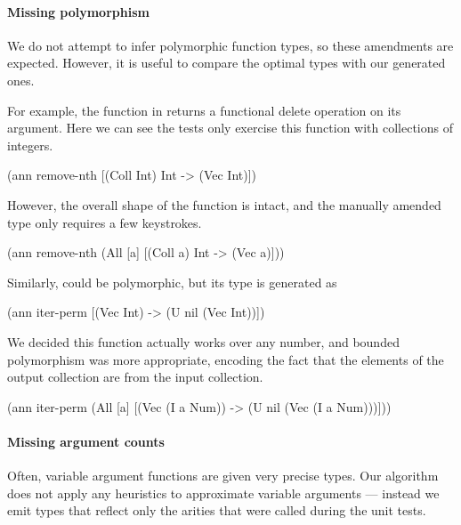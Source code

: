 \paragraph{Missing polymorphism}

We do not attempt to infer polymorphic function types, 
so these amendments are expected. However, it is useful
to compare the optimal types with our generated ones.

For example, the  function in 
returns a functional delete operation on its argument.
Here we can see the tests only exercise this function with
collections of integers.

\begin{cljlisting}
(ann remove-nth [(Coll Int) Int -> (Vec Int)])
\end{cljlisting}

However, the overall shape of the function is intact,
and the manually amended type only requires a few 
keystrokes.

\begin{cljlisting}
(ann remove-nth
  (All [a] [(Coll a) Int -> (Vec a)]))
\end{cljlisting}

Similarly,  could be polymorphic, 
but its type is generated as

\begin{cljlisting}
(ann iter-perm [(Vec Int) -> (U nil (Vec Int))])
\end{cljlisting}

We decided this function actually works over any number,
and bounded polymorphism was more appropriate, encoding
the fact that the elements of the output collection
are from the input collection.

\begin{cljlisting}
(ann iter-perm
  (All [a]
    [(Vec (I a Num)) -> (U nil (Vec (I a Num)))]))
\end{cljlisting}
%

\paragraph{Missing argument counts}
Often, variable argument functions are given very precise types.
Our algorithm does not apply any heuristics to approximate
variable arguments --- instead we emit types that reflect
only the arities that were called during the unit tests.


